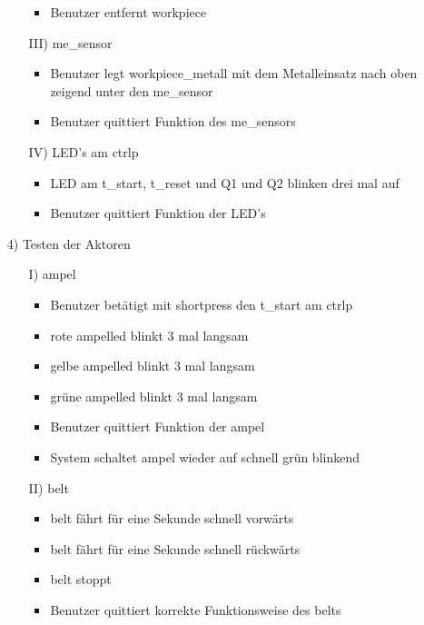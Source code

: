 \begin{enumerate}
\begin{enumerate}
\begin{itemize}
            \item Benutzer entfernt \gls{workpiece}
        \end{itemize}
        \item[III)] \Gls{me_sensor}
        \begin{itemize}
            \item Benutzer legt \gls{workpiece_metall} mit dem Metalleinsatz nach oben zeigend unter den \gls{me_sensor}
            \item Benutzer quittiert Funktion des \gls{me_sensor}s
        \end{itemize}
        \item[IV)] LED's am \gls{ctrlp}
        \begin{itemize}
            \item LED am \gls{t_start}, \gls{t_reset} und Q1 und Q2 blinken drei mal auf
            \item Benutzer quittiert Funktion der LED's
        \end{itemize}
    \end{enumerate}
    \item[4)] Testen der Aktoren
    \begin{enumerate}
        \item[I)] \Gls{ampel}
        \begin{itemize}
            \item Benutzer betätigt mit \gls{shortpress} den \gls{t_start} am \gls{ctrlp}
            \item rote \gls{ampelled} blinkt 3 mal langsam
            \item gelbe \gls{ampelled} blinkt 3 mal langsam
            \item grüne \gls{ampelled} blinkt 3 mal langsam
            \item Benutzer quittiert Funktion der \gls{ampel}
            \item System schaltet \gls{ampel} wieder auf schnell grün blinkend
        \end{itemize}
        \item[II)] \Gls{belt}
        \begin{itemize}
            \item \Gls{belt} fährt für eine Sekunde schnell vorwärts
            \item \Gls{belt} fährt für eine Sekunde schnell rückwärts
            \item \Gls{belt} stoppt
            \item Benutzer quittiert korrekte Funktionsweise des \gls{belt}s

\end{itemize}
\end{enumerate}
\end{enumerate}
